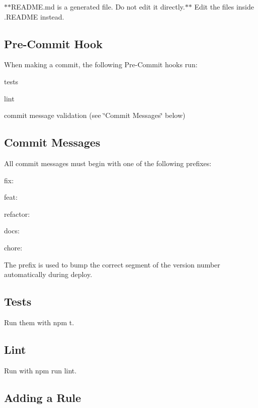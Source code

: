 $\ast$$\ast${\ttfamily R\+E\+A\+D\+M\+E.\+md} is a generated file. Do not edit it directly.$\ast$$\ast$ Edit the files inside {\ttfamily .R\+E\+A\+D\+ME} instead.

\subsection*{Pre-\/\+Commit Hook}

When making a commit, the following Pre-\/\+Commit hooks run\+:


\begin{DoxyItemize}
\item tests
\item lint
\item commit message validation (see \char`\"{}\+Commit Messages\char`\"{} below)
\end{DoxyItemize}

\subsection*{Commit Messages}

All commit messages must begin with one of the following prefixes\+:


\begin{DoxyItemize}
\item {\ttfamily fix\+:}
\item {\ttfamily feat\+:}
\item {\ttfamily refactor\+:}
\item {\ttfamily docs\+:}
\item {\ttfamily chore\+:}
\end{DoxyItemize}

The prefix is used to bump the correct segment of the version number automatically during deploy.

\subsection*{Tests}

Run them with {\ttfamily npm t}.

\subsection*{Lint}

Run with {\ttfamily npm run lint}.

\subsection*{Adding a Rule}

